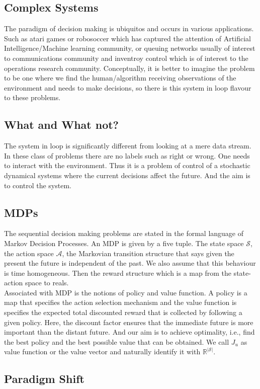 \documentclass{article}
\renewcommand{\S}{\mathcal{S}}
\newcommand{\A}{\mathcal{A}}
\newcommand{\R}{\mathbb{R}}
\begin{document}
\subsection{Complex Systems}
The paradigm of decision making is ubiquitos and occurs in various applications. Such as atari games or robosoccer which has captured the attention of Artificial Intelligence/Machine learning community, or queuing networks usually of interest to communications community and inventroy control which is of interest to the operations research community. Conceptually, it is better to imagine the problem to be one where we find the human/algorithm receiving observations of the environment and needs to make decisions, so there is this system in loop flavour to these problems.
\subsection{What and What not?}
The system in loop is significantly different from looking at a mere data stream. In these class of problems there are no labels such as right or wrong. One needs to interact with the environment. Thus it is a problem of control of a stochastic dynamical systems where the current decisions affect the future. And the aim is to control the system.
\subsection{MDPs}
The sequential decision making problems are stated in the formal language of Markov Decision Processes. An MDP is given by a five tuple.
The state space $\S$, the action space $\A$, the Markovian transition structure that says given the present the future is independent of the past. We also assume that this behaviour is time homogeneous. Then the reward structure which is a map from the state-action space to reals.\\
Associated with MDP is the notions of policy and value function. A policy is a map that specifies the action selection mechanism and the value function is specifies the expected total discounted reward that is collected by following a given policy. Here, the discount factor ensures that the immediate future is more important than the distant future. And our aim is to achieve optimality, i.e., find the best policy and the best possible value that can be obtained. We call $J_u$ as value function or the value vector and naturally identify it with $\R^{|\S|}$.

\subsection{Paradigm Shift}
\end{document}
